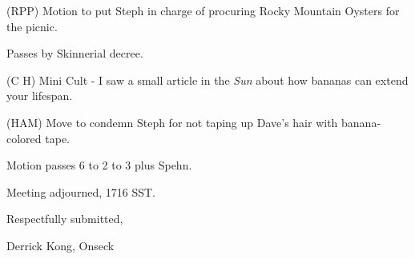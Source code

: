 (RPP) Motion to put Steph in charge of procuring Rocky Mountain
Oysters for the picnic.

Passes by Skinnerial decree.

(C H) Mini Cult - I saw a small article in the {\em Sun} about how
bananas can extend your lifespan.

(HAM) Move to condemn Steph for not taping up Dave's hair with
banana-colored tape.

Motion passes 6 to 2 to 3 plus Spehn.

Meeting adjourned, 1716 SST.

\vspace{0.15in}
\begin{center}
Respectfully submitted,

Derrick Kong, Onseck
\end{center}

